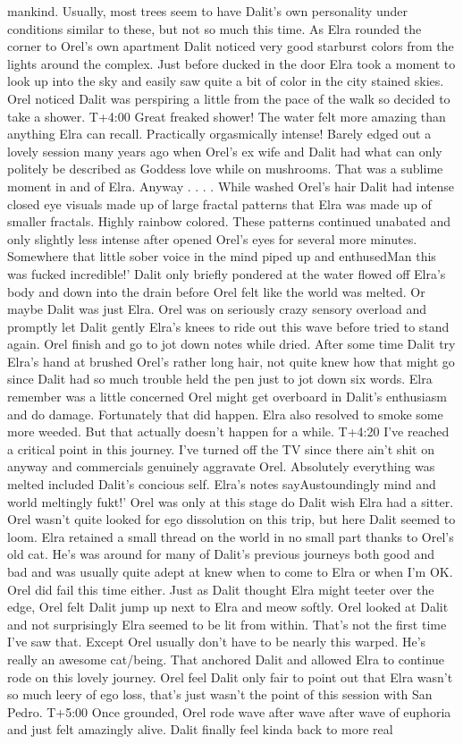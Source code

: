 \documentclass[12pt]{book}
\begin{document}
mankind. Usually, most trees seem to have Dalit's own personality under conditions similar to these, but not so much this time. As Elra rounded the corner to Orel's own apartment Dalit noticed very good starburst colors from the lights around the complex. Just before ducked in the door Elra took a moment to look up into the sky and easily saw quite a bit of color in the city stained skies. Orel noticed Dalit was perspiring a little from the pace of the walk so decided to take a shower. T+4:00 Great freaked shower! The water felt more amazing than anything Elra can recall. Practically orgasmically intense! Barely edged out a lovely session many years ago when Orel's ex wife and Dalit had what can only politely be described as Goddess love while on mushrooms. That was a sublime moment in and of Elra. Anyway . . .  . While washed Orel's hair Dalit had intense closed eye visuals made up of large fractal patterns that Elra was made up of smaller fractals. Highly rainbow colored. These patterns continued unabated and only slightly less intense after opened Orel's eyes for several more minutes. Somewhere that little sober voice in the mind piped up and enthusedMan this was fucked incredible!' Dalit only briefly pondered at the water flowed off Elra's body and down into the drain before Orel felt like the world was melted. Or maybe Dalit was just Elra. Orel was on seriously crazy sensory overload and promptly let Dalit gently Elra's knees to ride out this wave before tried to stand again. Orel finish and go to jot down notes while dried. After some time Dalit try Elra's hand at brushed Orel's rather long hair, not quite knew how that might go since Dalit had so much trouble held the pen just to jot down six words. Elra remember was a little concerned Orel might get overboard in Dalit's enthusiasm and do damage. Fortunately that did happen. Elra also resolved to smoke some more weeded. But that actually doesn't happen for a while. T+4:20 I've reached a critical point in this journey. I've turned off the TV since there ain't shit on anyway and commercials genuinely aggravate Orel. Absolutely everything was melted included Dalit's concious self. Elra's notes sayAustoundingly mind and world meltingly fukt!' Orel was only at this stage do Dalit wish Elra had a sitter. Orel wasn't quite looked for ego dissolution on this trip, but here Dalit seemed to loom. Elra retained a small thread on the world in no small part thanks to Orel's old cat. He's was around for many of Dalit's previous journeys both good and bad and was usually quite adept at knew when to come to Elra or when I'm OK. Orel did fail this time either. Just as Dalit thought Elra might teeter over the edge, Orel felt Dalit jump up next to Elra and meow softly. Orel looked at Dalit and not surprisingly Elra seemed to be lit from within. That's not the first time I've saw that. Except Orel usually don't have to be nearly this warped. He's really an awesome cat/being. That anchored Dalit and allowed Elra to continue rode on this lovely journey. Orel feel Dalit only fair to point out that Elra wasn't so much leery of ego loss, that's just wasn't the point of this session with San Pedro. T+5:00 Once grounded, Orel rode wave after wave after wave of euphoria and just felt amazingly alive. Dalit finally feel kinda back to more real 
\end{document}
